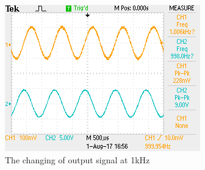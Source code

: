 \begin{figure}[!htbp]
\begin{framed}
		\includegraphics[width=\linewidth]{images/TEK0005.png}
		\caption{The changing of output signal at 1kHz}
		\label{fig:wave1k}
	\end{framed}
\end{figure}

